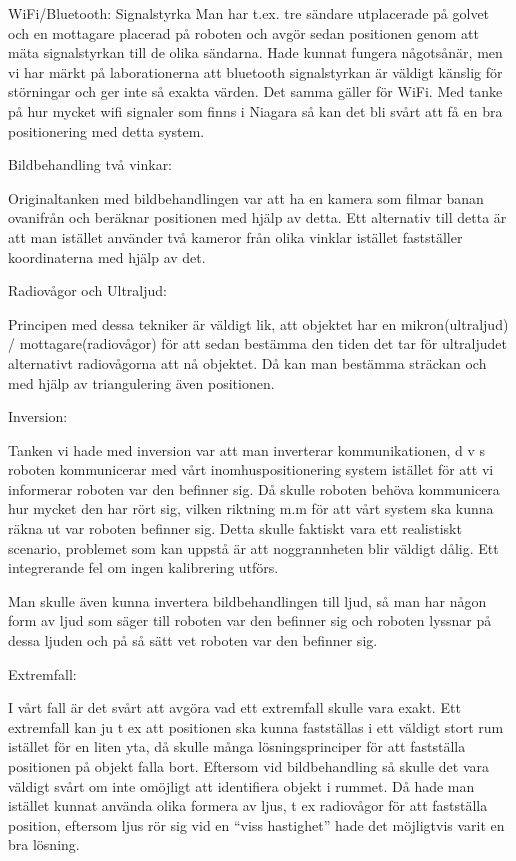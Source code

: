 \documentclass[11pt, a4paper]{report}
\begin{document}
WiFi/Bluetooth: Signalstyrka
Man har t.ex. tre sändare utplacerade på golvet och en mottagare placerad på roboten och avgör sedan positionen genom att mäta signalstyrkan till de olika sändarna. 
Hade kunnat fungera någotsånär, men vi har märkt på laborationerna att bluetooth signalstyrkan är väldigt känslig för störningar och ger inte så exakta värden. Det samma gäller för WiFi. Med tanke på hur mycket wifi signaler som finns i Niagara så kan det bli svårt att få en bra positionering med detta system.

Bildbehandling två vinkar:

Originaltanken med bildbehandlingen var att ha en kamera som filmar banan ovanifrån och beräknar positionen med hjälp av detta. Ett alternativ till detta är att man istället använder två kameror från olika vinklar istället fastställer koordinaterna med hjälp av det.

Radiovågor och Ultraljud:

Principen med dessa tekniker är väldigt lik, att objektet har en mikron(ultraljud) / mottagare(radiovågor) för att sedan bestämma den tiden det tar för ultraljudet alternativt radiovågorna att nå objektet. Då kan man bestämma sträckan och med hjälp av triangulering även positionen.


Inversion:

Tanken vi hade med inversion var att man inverterar kommunikationen, d v s roboten kommunicerar med vårt inomhuspositionering system istället för att vi informerar roboten var den befinner sig. Då skulle roboten behöva kommunicera hur mycket den har rört sig, vilken riktning m.m för att vårt system ska kunna räkna ut var roboten befinner sig. Detta skulle faktiskt vara ett realistiskt scenario, problemet som kan uppstå är att noggrannheten blir väldigt dålig. Ett integrerande fel om ingen kalibrering utförs.

Man skulle även kunna invertera bildbehandlingen till ljud, så man har någon form av ljud som säger till roboten var den befinner sig och roboten lyssnar på dessa ljuden och på så sätt vet roboten var den befinner sig. 

Extremfall:

I vårt fall är det svårt att avgöra vad ett extremfall skulle vara exakt. Ett extremfall kan ju t ex att positionen ska kunna fastställas i ett väldigt stort rum istället för en liten yta, då skulle många lösningsprinciper för att fastställa positionen på objekt falla bort. Eftersom vid bildbehandling så skulle det vara väldigt svårt om inte omöjligt att identifiera objekt i rummet. Då hade man istället kunnat använda olika formera av ljus, t ex radiovågor för att fastställa position, eftersom ljus rör sig vid en “viss hastighet” hade det möjligtvis varit en bra lösning.
\end{document}
